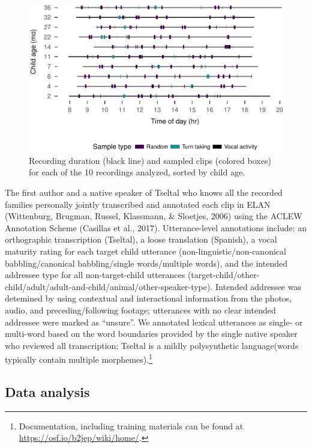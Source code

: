 \documentclass[floatsintext,man]{apa6}
\theoremstyle{definition}
\theoremstyle{definition}
\theoremstyle{definition}
\theoremstyle{remark}
\begin{document}
\begin{figure}
\centering
\includegraphics{Tseltal-CLE_files/figure-latex/fig2-1.pdf}
\caption{\label{fig:fig2}Recording duration (black line) and sampled clips
(colored boxes) for each of the 10 recordings analyzed, sorted by child
age.}
\end{figure}

The first author and a native speaker of Tseltal who knows all the
recorded families personally jointly transcribed and annotated each clip
in ELAN (Wittenburg, Brugman, Russel, Klassmann, \& Sloetjes, 2006)
using the ACLEW Annotation Scheme (Casillas et al., 2017).
Utterance-level annotations include: an orthographic transcription
(Tseltal), a loose translation (Spanish), a vocal maturity rating for
each target child utterance (non-linguistic/non-canonical
babbling/canonical babbling/single words/multiple words), and the
intended addressee type for all non-target-child utterances
(target-child/other-child/adult/adult-and-child/animal/other-speaker-type).
Intended addressee was detemined by using contextual and interactional
information from the photos, audio, and preceding/following footage;
utterances with no clear intended addressee were marked as
\enquote{unsure}. We annotated lexical utterances as single- or
multi-word based on the word boundaries provided by the single native
speaker who reviewed all transcription; Tseltal is a mildly
polysynthetic language(words typically contain multiple
morphemes).\footnote{Documentation, including training materials can be
  found at \url{https://osf.io/b2jep/wiki/home/}.}

\subsection{Data analysis}\label{methods-analysisinfo}
\end{document}
